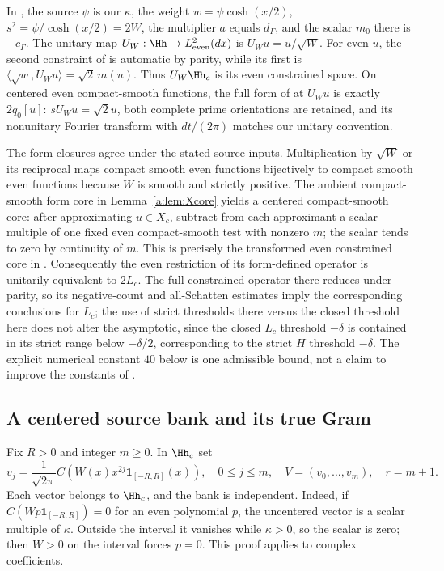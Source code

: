 In \cite[Section~2, equations (4)--(6)]{vfourSchubr}, the source $\psi$ is our $\kappa$, the weight $w=\psi\cosh(x/2)$, $s^2=\psi/\cosh(x/2)=2W$, the multiplier $a$ equals $d_\Gamma$, and the scalar $m_0$ there is $-c_\Gamma$. The unitary map $U_W:\Hh\to L^2_{\rm even}(dx)$ is $U_Wu=u/\sqrt W$. For even $u$, the second constraint of \cite{vfourSchubr} is automatic by parity, while its first is $\langle\sqrt w,U_Wu\rangle=\sqrt2\,m(u)$. Thus $U_W\Hh_c$ is its even constrained space. On centered even compact-smooth functions, the full form of \cite{vfourSchubr} at $U_Wu$ is exactly $2q_0[u]$: $sU_Wu=\sqrt2u$, both complete prime orientations are retained, and its nonunitary Fourier transform with $dt/(2\pi)$ matches our unitary convention.

The form closures agree under the stated source inputs. Multiplication by $\sqrt W$ or its reciprocal maps compact smooth even functions bijectively to compact smooth even functions because $W$ is smooth and strictly positive. The ambient compact-smooth form core in Lemma~\ref{a:lem:Xcore} yields a centered compact-smooth core: after approximating $u\in X_c$, subtract from each approximant a scalar multiple of one fixed even compact-smooth test with nonzero $m$; the scalar tends to zero by continuity of $m$. This is precisely the transformed even constrained core in \cite{vfourSchubr}. Consequently the even restriction of its form-defined operator is unitarily equivalent to $2L_c$. The full constrained operator there reduces under parity, so its negative-count and all-Schatten estimates imply the corresponding conclusions for $L_c$; the use of strict thresholds there versus the closed threshold here does not alter the asymptotic, since the closed $L_c$ threshold $-\delta$ is contained in its strict range below $-\delta/2$, corresponding to the strict $H$ threshold $-\delta$. The explicit numerical constant $40$ below is one admissible bound, not a claim to improve the constants of \cite{vfourSchubr}.

\subsection{A centered source bank and its true Gram}\label{vfourD:bank}
Fix $R>0$ and integer $m\ge0$. In $\Hh_c$ set
\begin{equation}\label{vfourD:bankdef}
 v_j=\frac1{\sqrt{2\pi}}C\!\left(W(x)x^{2j}\mathbf1_{[-R,R]}(x)\right),\quad 0\le j\le m,\quad V=(v_0,\ldots,v_m),\quad r=m+1.
\end{equation}
Each vector belongs to $\Hh_c$, and the bank is independent. Indeed, if $C(Wp\mathbf1_{[-R,R]})=0$ for an even polynomial $p$, the uncentered vector is a scalar multiple of $\kappa$. Outside the interval it vanishes while $\kappa>0$, so the scalar is zero; then $W>0$ on the interval forces $p=0$. This proof applies to complex coefficients.

